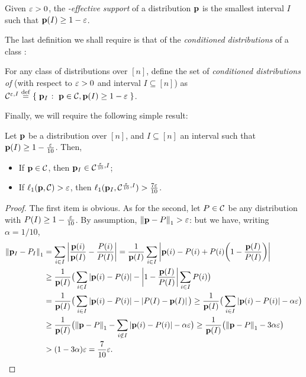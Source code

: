 \begin{definition}\label{def:effective:support}
Given $\eps > 0$, the \emph{\eps-effective support} of a distribution $\D$ is the smallest interval $I$ such that $\D(I) \geq 1-\eps$.
\end{definition}

The last definition we shall require is that of the \emph{conditioned distributions} of a class \class:
\begin{definition}
For any class of distributions \class over $[n]$, define the set of \emph{conditioned distributions of \class} (with respect to $\eps > 0$ and interval $I\subseteq[n]$) as $\class^{\eps,I}\eqdef \setOfSuchThat{\D_I}{\D\in\class, \D(I) \geq 1-\eps}$.
\end{definition}

Finally, we will require the following simple result:
\begin{lemma}\label{lemma:conditioned:class}
Let $\D$ be a distribution over $[n]$, and $I\subseteq[n]$ an interval such that $\D(I) \geq 1- \frac{\eps}{10}$. Then,
\begin{itemize}
  \item If $\D\in\class$, then $\D_I\in\class^{\frac{\eps}{10},I}$;
  \item If $\lp[1](\D,\class) > \eps$, then $\lp[1](\D_I, \class^{\frac{\eps}{10},I}) > \frac{7\eps}{10}$.
\end{itemize}
\end{lemma}
\begin{proof}
The first item is obvious. As for the second, let $P\in\class$ be any distribution with $P(I)\geq 1-\frac{\eps}{10}$. By assumption, $\normone{\D - P} > \eps$: but we have, writing $\alpha=1/10$,
  \begin{align*}
    \normone{\D_I - P_I} &=\sum_{i\in I}\abs{ \frac{\D(i)}{\D(I)} - \frac{P(i)}{P(I)} }
    = \frac{1}{\D(I)}\sum_{i\in I}\abs{ \D(i) - P(i) + P(i)\mleft(1- \frac{\D(I)}{P(I)}\mright) } \\
    &\geq \frac{1}{\D(I)}\big( \sum_{i\in I}\abs{ \D(i) - P(i) } - \abs{1- \frac{\D(I)}{P(I)} } \sum_{i\in I} P(i) \big)\\
    &= \frac{1}{\D(I)}\big( \sum_{i\in I}\abs{ \D(i) - P(i) } - \abs{P(I)- \D(I) } \big)
    \geq \frac{1}{\D(I)}\big( \sum_{i\in I}\abs{ \D(i) - P(i) } - \alpha\eps \big)\\
   &\geq \frac{1}{\D(I)}\big( \normone{\D-P} - \sum_{i\notin I} \abs{ \D(i) - P(i) } - \alpha\eps \big)
   \geq \frac{1}{\D(I)}\big( \normone{\D-P} - 3\alpha\eps \big) \\
   &> (1- 3\alpha)\eps  
   = \frac{7}{10}\eps.
  \end{align*}
\end{proof}


